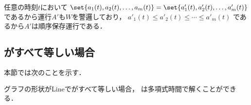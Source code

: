 任意の時刻$t$において
$\set{ a_1(t), a_2(t), \ldots, a_m(t) } = \set{ a'_1(t), a'_2(t), \ldots, a'_m(t) }$
であるから運行$A'$も$W$を警邏しており，
%
$a'_1(t) \leq a'_2(t) \leq \cdots \leq a'_m(t)$
であるから$A'$は順序保存運行である．







\subsection{{\idletime}がすべて等しい場合}
\label{subsec:LineUnaryTimelimit}




本節では次のことを示す．

\begin{theo}
	\label{theo:LineEqualTimelimit}
	グラフの形状がLineで{\idletime}がすべて等しい場合，
	{\patrolling}は多項式時間で解くことができる．
\end{theo}





